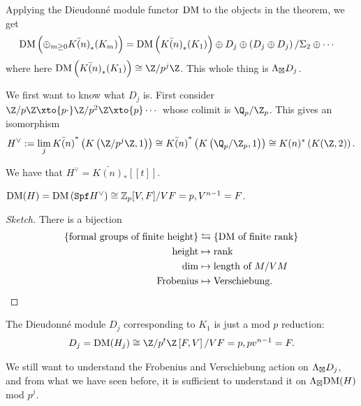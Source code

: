 Applying the Dieudonn\'e module functor $\text{DM}$ to the objects in the theorem, we get
\begin{align*}
    \text{DM} \left( \oplus_{m\ge 0} \bar{K(n)}_\ast(K_m) \right) &=\text{DM} \left( \bar{K(n)}_\ast(K_1)\right) \oplus D_j \oplus \left( D_j \oplus D_j \right)/\Sigma_2 \oplus \cdots
\end{align*}
where here $\DM \left( \bar{K(n)}_\ast(K_1)\right) \cong \Z/p^j \Z$. This whole thing is $\Lambda_{\boxtimes} D_j$.

We first want to know what $D_j$ is. First consider $\Z/p\Z \xto{p\cdot } \Z/p^2 \Z \xto{p} \cdots $ whose colimit is $\Q_p/\Z_p$. This gives an isomorphism
\begin{align*}
    H^\vee := \lim_j \bar{K(n)}^\ast \left( K \left( \Z/p^j \Z,1 \right) \right) \cong \bar{K(n)}^\ast \left( K \left( \Q_p/\Z_p, 1 \right) \right) \cong K(n)^\ast \left( K(\Z,2) \right).
\end{align*}

We have that $H^\vee = \bar{K(n)}_\ast [[t]]$.

\begin{claim} $\text{DM}(H) = \text{DM} \left( \texttt{Spf} H^\vee \right) \cong \mathbb{Z}_p [V,F]/VF=p, V^{n-1} = F$.
\end{claim}
\begin{proof}[Sketch] There is a bijection
\begin{align*}
    \left\{ \text{formal groups of finite height} \right\} & \leftrightarrows \left\{ \text{DM} \text{ of finite rank} \right\} \\
    \text{height} &\mapsto \text{rank} \\
    \dim &\mapsto \text{length of } M/VM \\
    \text{Frobenius} &\mapsto \text{Verschiebung}.
\end{align*}
\end{proof}

\begin{corollary} The Dieudonn\'e module $D_j$ corresponding to $K_1$ is just a mod $p$ reduction:
\begin{align*}
    D_j = \DM(H_j) \cong \Z / p^t \Z \left[ F,V \right]/VF=p, pv^{n-1} = F.
\end{align*}
\end{corollary}

We still want to understand the Frobenius and Verschiebung action on $\Lambda_\boxtimes D_j$, and from what we have seen before, it is sufficient to understand it on $\Lambda_\boxtimes \text{DM}(H)$ mod $p^j$.

